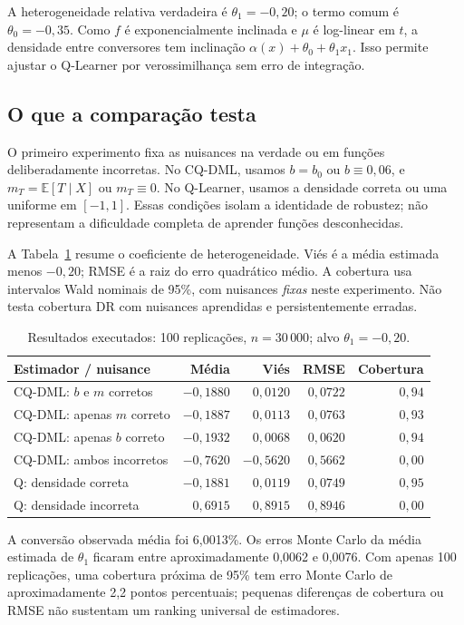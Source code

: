 \documentclass[11pt,a4paper]{article}
\newcommand{\E}{\mathbb E}
\begin{document}
A heterogeneidade relativa verdadeira é $\theta_1=-0{,}20$; o termo comum é $\theta_0=-0{,}35$. Como $f$ é exponencialmente inclinada e $\mu$ é log-linear em $t$, a densidade entre conversores tem inclinação $\alpha(x)+\theta_0+\theta_1x_1$. Isso permite ajustar o Q-Learner por verossimilhança sem erro de integração.

\subsection{O que a comparação testa}
O primeiro experimento fixa as nuisances na verdade ou em funções deliberadamente incorretas. No CQ-DML, usamos $b=b_0$ ou $b\equiv0{,}06$, e $m_T=\E[T\mid X]$ ou $m_T\equiv0$. No Q-Learner, usamos a densidade correta ou uma uniforme em $[-1,1]$. Essas condições isolam a identidade de robustez; não representam a dificuldade completa de aprender funções desconhecidas.

A Tabela~\ref{tab:mc} resume o coeficiente de heterogeneidade. Viés é a média estimada menos $-0{,}20$; RMSE é a raiz do erro quadrático médio. A cobertura usa intervalos Wald nominais de 95\%, com nuisances \emph{fixas} neste experimento. Não testa cobertura DR com nuisances aprendidas e persistentemente erradas.

\begin{table}[htbp]
\centering
\caption{Resultados executados: 100 replicações, $n=30\,000$; alvo $\theta_1=-0{,}20$.}
\label{tab:mc}
\small
\begin{tabular}{lrrrr}
\toprule
Estimador / nuisance & Média & Viés & RMSE & Cobertura \\
\midrule
CQ-DML: $b$ e $m$ corretos & $-0{,}1880$ & $0{,}0120$ & $0{,}0722$ & $0{,}94$ \\
CQ-DML: apenas $m$ correto & $-0{,}1887$ & $0{,}0113$ & $0{,}0763$ & $0{,}93$ \\
CQ-DML: apenas $b$ correto & $-0{,}1932$ & $0{,}0068$ & $0{,}0620$ & $0{,}94$ \\
CQ-DML: ambos incorretos & $-0{,}7620$ & $-0{,}5620$ & $0{,}5662$ & $0{,}00$ \\
Q: densidade correta & $-0{,}1881$ & $0{,}0119$ & $0{,}0749$ & $0{,}95$ \\
Q: densidade incorreta & $0{,}6915$ & $0{,}8915$ & $0{,}8946$ & $0{,}00$ \\
\bottomrule
\end{tabular}
\end{table}
A conversão observada média foi 6,0013\%. Os erros Monte Carlo da média estimada de $\theta_1$ ficaram entre aproximadamente 0,0062 e 0,0076. Com apenas 100 replicações, uma cobertura próxima de 95\% tem erro Monte Carlo de aproximadamente 2,2 pontos percentuais; pequenas diferenças de cobertura ou RMSE não sustentam um ranking universal de estimadores.
\end{document}
